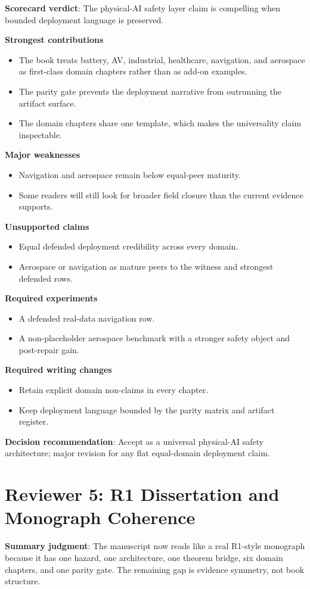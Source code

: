 \textbf{Scorecard verdict}: The physical-AI safety layer claim is compelling when bounded deployment language is preserved.

\textbf{Strongest contributions}
\begin{itemize}
\item The book treats battery, AV, industrial, healthcare, navigation, and aerospace as first-class domain chapters rather than as add-on examples.
\item The parity gate prevents the deployment narrative from outrunning the artifact surface.
\item The domain chapters share one template, which makes the universality claim inspectable.
\end{itemize}
\textbf{Major weaknesses}
\begin{itemize}
\item Navigation and aerospace remain below equal-peer maturity.
\item Some readers will still look for broader field closure than the current evidence supports.
\end{itemize}
\textbf{Unsupported claims}
\begin{itemize}
\item Equal defended deployment credibility across every domain.
\item Aerospace or navigation as mature peers to the witness and strongest defended rows.
\end{itemize}
\textbf{Required experiments}
\begin{itemize}
\item A defended real-data navigation row.
\item A non-placeholder aerospace benchmark with a stronger safety object and post-repair gain.
\end{itemize}
\textbf{Required writing changes}
\begin{itemize}
\item Retain explicit domain non-claims in every chapter.
\item Keep deployment language bounded by the parity matrix and artifact register.
\end{itemize}
\textbf{Decision recommendation}: Accept as a universal physical-AI safety architecture; major revision for any flat equal-domain deployment claim.

\section{Reviewer 5: R1 Dissertation and Monograph Coherence}
\textbf{Summary judgment}: The manuscript now reads like a real R1-style monograph because it has one hazard, one architecture, one theorem bridge, six domain chapters, and one parity gate. The remaining gap is evidence symmetry, not book structure.

